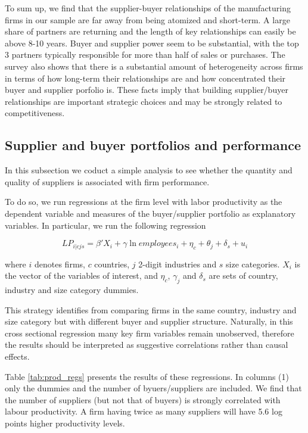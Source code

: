 \documentclass[final, dvipsnames, authoryear,12pt]{elsarticle}
\begin{document}
To sum up, we find that the supplier-buyer relationships of the manufacturing firms in our sample are far away from being atomized and short-term. A large share of partners are returning and the length of key relationships can easily be above 8-10 years. Buyer and supplier power seem to be substantial, with the top 3 partners typically responsible for more than half of sales or purchases. The survey also shows that there is a substantial amount of heterogeneity across firms in terms of how long-term their relationships are and how concentrated their buyer and supplier porfolio is. These facts imply that building supplier/buyer relationships are important strategic choices and may be strongly related to competitiveness.


\subsection{Supplier and buyer portfolios and performance}

In this subsection we coduct a simple analysis to see whether the quantity and quality of suppliers is associated with firm performance. 

To do so, we run regressions at the firm level with labor productivity as the dependent variable and measures of the buyer/supplier portfolio as explanatory variables. In particular, we run the following regression

\begin{equation}
    LP_{i|cjs}=\beta' X_{i}+\gamma \ln employees_i+\eta_c+\theta_j+\delta_s+u_i
\end{equation}{}

where $i$ denotes firms, $c$ countries, $j$ 2-digit industries and $s$ size categories. $X_{i}$ is the vector of the variables of interest, and $\eta_c$, $\gamma_j$ and $\delta_s$ are sets of country, industry and size category dummies. 

This strategy identifies from comparing firms in the same country, industry and size category but with different buyer and supplier structure. Naturally, in this cross sectional regression many key firm variables remain unobserved, therefore the results should be interpreted as suggestive correlations rather than causal effects.

Table \ref{tab:prod_regs} presents the results of these regressions. In columns (1) only the dummies and the number of byuers/suppliers are included. We find that the number of suppliers (but not that of buyers) is strongly correlated with labour productivity. A firm having twice as many suppliers will have 5.6 log points higher productivity levels. 
\end{document}
